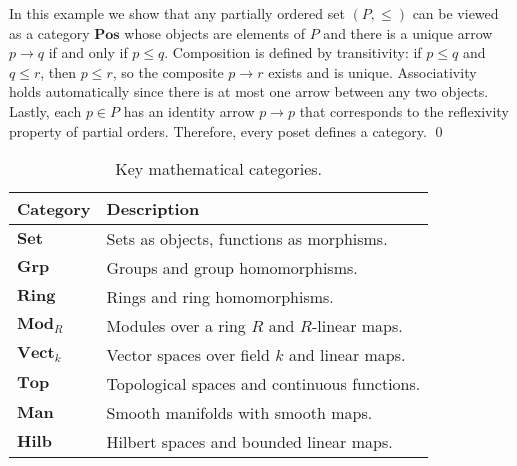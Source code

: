 \begin{example}
In this example we show that any partially ordered set $(P, \leq)$ can be viewed as a category $\mathbf{Pos}$ whose objects are elements of $P$ and there is a unique arrow $p \to q$ 
if and only if $p \leq q$.  
Composition is defined by transitivity: if $p \leq q$ and $q \leq r$, then $p \leq r$, 
so the composite $p \to r$ exists and is unique.  
Associativity holds automatically since there is at most one arrow between any two objects.  
Lastly, each $p \in P$ has an identity arrow $p \to p$ that corresponds to the reflexivity property of partial orders.
Therefore, every poset defines a category. \qed
\end{example}

\begin{table*}[h!]
\centering
\begin{tabular}{ll}
\hline
\textbf{Category} & \textbf{Description} \\
\hline
$\mathbf{Set}$      & Sets as objects, functions as morphisms. \\
$\mathbf{Grp}$      & Groups and group homomorphisms. \\
$\mathbf{Ring}$     & Rings and ring homomorphisms. \\
$\mathbf{Mod}_R$    & Modules over a ring $R$ and $R$-linear maps. \\
$\mathbf{Vect}_k$   & Vector spaces over field $k$ and linear maps. \\
$\mathbf{Top}$      & Topological spaces and continuous functions. \\
$\mathbf{Man}$      & Smooth manifolds with smooth maps. \\
$\mathbf{Hilb}$     & Hilbert spaces and bounded linear maps. \\
\hline
\end{tabular}
\caption{Key mathematical categories.}
\label{tab:math-categories}
\end{table*}

